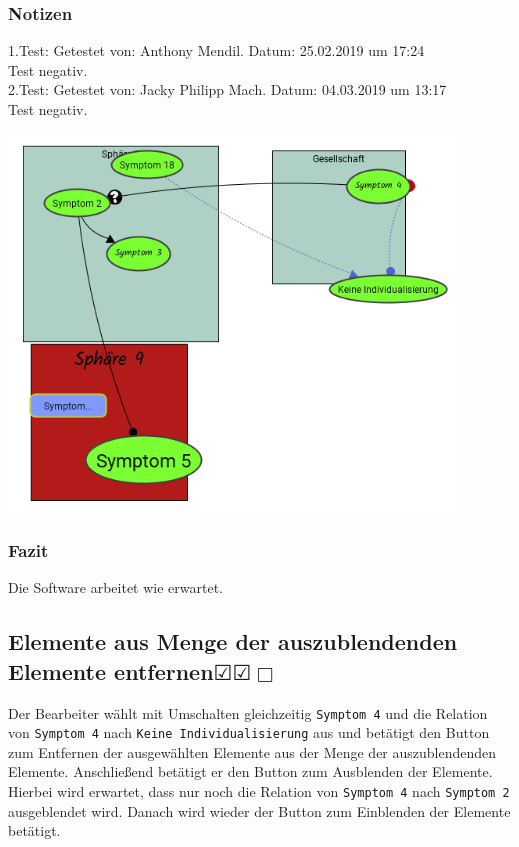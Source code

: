 \documentclass[enabledeprecatedfontcommands]{scrartcl}
\newcommand{\subsectiont}[2]{\subsection[#1]{#1{\normalsize\normalfont #2}}}
\newcommand{\leer}{$\Box$}
\newcommand{\ok}{$\CheckedBox$}
\begin{document}
\subsubsection{Notizen}
1.Test: Getestet von: Anthony Mendil. Datum: 25.02.2019 um 17:24 \\
Test negativ. \\
2.Test: Getestet von: Jacky Philipp Mach. Datum: 04.03.2019 um 13:17 \\
Test negativ.
\begin{center}
\includegraphics[height=10cm]{3_54.PNG}
\end{center}
\subsubsection{Fazit}
Die Software arbeitet wie erwartet.

\subsectiont{Elemente aus Menge der auszublendenden Elemente entfernen}{\dotfill\ok\ok\leer}
Der Bearbeiter wählt mit Umschalten gleichzeitig \texttt{Symptom 4} und die Relation von \texttt{Symptom 4} nach \texttt{Keine Individualisierung} aus und betätigt den Button zum Entfernen der ausgewählten Elemente aus der Menge der auszublendenden Elemente. Anschließend betätigt er den Button zum Ausblenden der Elemente. Hierbei wird erwartet, dass nur noch die Relation von \texttt{Symptom 4} nach \texttt{Symptom 2} ausgeblendet wird. Danach wird wieder der Button zum Einblenden der Elemente betätigt. 
\end{document}
